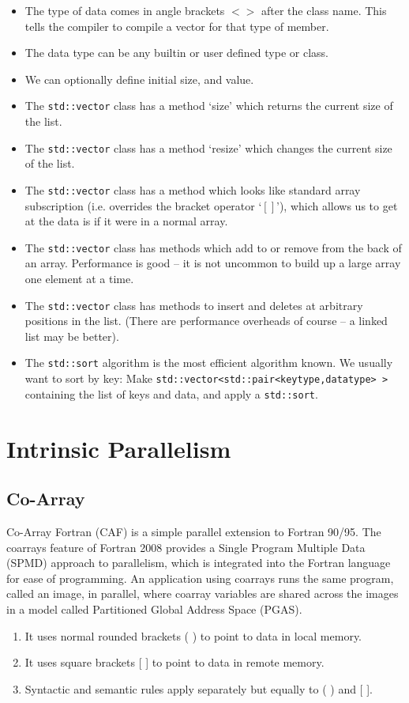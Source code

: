 \documentclass[11pt]{book} %
\begin{document}
\begin{itemize}
\item The type of data comes in angle brackets $<>$ after the class name. This tells the compiler to compile a vector
for that type of member.
\item The data type can be any built­in or user defined type or class.
\item We can optionally define initial size, and value.
\item The \verb|std::vector| class has a method ‘size’ which returns the current size of the list.
\item The \verb|std::vector| class has a method ‘resize’ which changes the current size of the list.
\item The \verb|std::vector| class has a method which looks like standard array subscription (i.e. overrides the bracket
operator ‘$[]$’), which allows us to get at the data is if it were in a normal array.
\item The \verb|std::vector| class has methods which add to or remove from the back of an array. Performance is good – it is not uncommon to build up a large array one element at a time.
\item The \verb|std::vector| class has methods to insert and deletes at arbitrary positions in the list. (There are performance overheads of course – a linked list may be better).
\item The \verb|std::sort| algorithm is the most efficient algorithm known. We usually want to sort by key: Make
\verb|std::vector<std::pair<keytype,datatype> >| containing the list of keys and data, and apply a
\verb|std::sort|.
\end{itemize}



\chapter{Intrinsic Parallelism}

\section{Co-Array}

Co-Array Fortran (CAF) is a simple parallel extension to Fortran 90/95. The coarrays feature of Fortran 2008 provides a Single Program Multiple Data (SPMD) approach to parallelism, which is integrated into the Fortran language for ease of programming. An application using coarrays runs the same program, called an image, in parallel, where coarray variables are shared across the images in a model called Partitioned Global Address Space (PGAS).
\begin{enumerate}
\item It uses normal rounded brackets ( ) to point to data in local memory.
\item It uses square brackets [ ] to point to data in remote memory.
\item Syntactic and semantic rules apply separately but equally to ( ) and [ ].
\end{enumerate}
\end{document}
